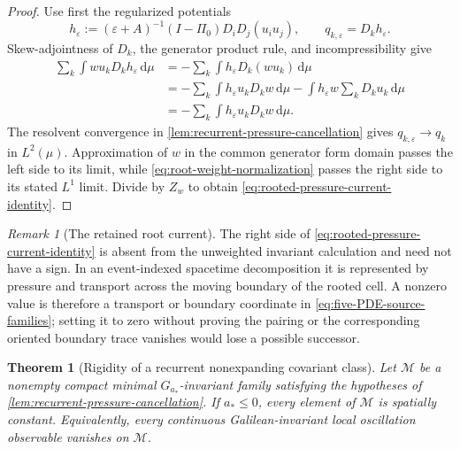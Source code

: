 \documentclass[11pt]{amsart}
\numberwithin{equation}{section}
\theoremstyle{plain}
\newtheorem{theorem}{Theorem}[section]
\theoremstyle{definition}
\theoremstyle{remark}
\newtheorem{remark}[remark]{Remark}
\newcommand{\dd}{\,\mathrm d}
\begin{document}
\begin{proof}
Use first the regularized potentials
\[
 h_\varepsilon
 :=(\varepsilon+A)^{-1}(I-\Pi_0)D_iD_j(u_iu_j),
 \qquad q_{k,\varepsilon}=D_kh_\varepsilon.
\]
Skew-adjointness of \(D_k\), the generator product rule, and
incompressibility give
\begin{align*}
 \sum_k\int wu_kD_kh_\varepsilon\dd\mu
 &=-\sum_k\int h_\varepsilon D_k(wu_k)\dd\mu\\
 &=-\sum_k\int h_\varepsilon u_kD_kw\dd\mu
   -\int h_\varepsilon w\sum_kD_ku_k\dd\mu\\
 &=-\sum_k\int h_\varepsilon u_kD_kw\dd\mu.
\end{align*}
The resolvent convergence in
\cref{lem:recurrent-pressure-cancellation} gives
\(q_{k,\varepsilon}\to q_k\) in \(L^2(\mu)\).  Approximation of \(w\) in
the common generator form domain passes the left side to its limit, while
\eqref{eq:root-weight-normalization} passes the right side to its stated
\(L^1\) limit.  Divide by \(Z_w\) to obtain
\eqref{eq:rooted-pressure-current-identity}.
\end{proof}

\begin{remark}[The retained root current]
\label{rem:retained-root-current}
The right side of \eqref{eq:rooted-pressure-current-identity} is absent from
the unweighted invariant calculation and need not have a sign.  In an
event-indexed spacetime decomposition it is represented by pressure and
transport across the moving boundary of the rooted cell.  A nonzero value is
therefore a transport or boundary coordinate in
\eqref{eq:five-PDE-source-families}; setting it to zero without proving the
pairing or the corresponding oriented boundary trace vanishes would lose a
possible successor.
\end{remark}

\begin{theorem}[Rigidity of a recurrent nonexpanding covariant class]
\label{thm:recurrent-nonexpanding-rigidity}
Let \(\mathcal M\) be a nonempty compact minimal
\(G_{a_*}\)-invariant family satisfying the hypotheses of
\cref{lem:recurrent-pressure-cancellation}.  If \(a_*\le0\), every element
of \(\mathcal M\) is spatially constant.  Equivalently, every continuous
Galilean-invariant local oscillation observable vanishes on \(\mathcal M\).
\end{theorem}
\end{document}

